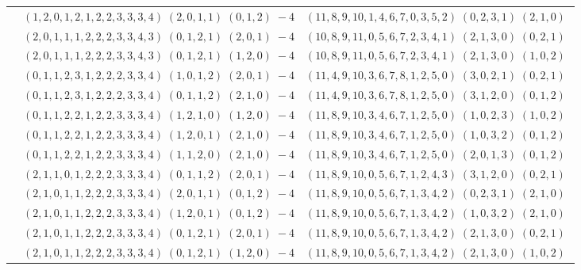 \documentclass[11pt]{article}
\begin{document}
\begin{longtable}[l]{|c|c|c|}
 \cline{2-3} 
 & $(1 ,2 ,0 ,1 ,2 ,1 ,2 ,2 ,3 ,3 ,3 ,4) \;(2 ,0 ,1 ,1) \;(0 ,1 ,2) \;-4$ & $(11 ,8 ,9 ,10 ,1 ,4 ,6 ,7 ,0 ,3 ,5 ,2) \;(0 ,2 ,3 ,1) \;(2 ,1 ,0) \;$\\ 
 \cline{2-3} 
 & $(2 ,0 ,1 ,1 ,1 ,2 ,2 ,2 ,3 ,3 ,4 ,3) \;(0 ,1 ,2 ,1) \;(2 ,0 ,1) \;-4$ & $(10 ,8 ,9 ,11 ,0 ,5 ,6 ,7 ,2 ,3 ,4 ,1) \;(2 ,1 ,3 ,0) \;(0 ,2 ,1) \;$\\ 
 \cline{2-3} 
 & $(2 ,0 ,1 ,1 ,1 ,2 ,2 ,2 ,3 ,3 ,4 ,3) \;(0 ,1 ,2 ,1) \;(1 ,2 ,0) \;-4$ & $(10 ,8 ,9 ,11 ,0 ,5 ,6 ,7 ,2 ,3 ,4 ,1) \;(2 ,1 ,3 ,0) \;(1 ,0 ,2) \;$\\ 
 \cline{2-3} 
 & $(0 ,1 ,1 ,2 ,3 ,1 ,2 ,2 ,2 ,3 ,3 ,4) \;(1 ,0 ,1 ,2) \;(2 ,0 ,1) \;-4$ & $(11 ,4 ,9 ,10 ,3 ,6 ,7 ,8 ,1 ,2 ,5 ,0) \;(3 ,0 ,2 ,1) \;(0 ,2 ,1) \;$\\ 
 \cline{2-3} 
 & $(0 ,1 ,1 ,2 ,3 ,1 ,2 ,2 ,2 ,3 ,3 ,4) \;(0 ,1 ,1 ,2) \;(2 ,1 ,0) \;-4$ & $(11 ,4 ,9 ,10 ,3 ,6 ,7 ,8 ,1 ,2 ,5 ,0) \;(3 ,1 ,2 ,0) \;(0 ,1 ,2) \;$\\ 
 \cline{2-3} 
 & $(0 ,1 ,1 ,2 ,2 ,1 ,2 ,2 ,3 ,3 ,3 ,4) \;(1 ,2 ,1 ,0) \;(1 ,2 ,0) \;-4$ & $(11 ,8 ,9 ,10 ,3 ,4 ,6 ,7 ,1 ,2 ,5 ,0) \;(1 ,0 ,2 ,3) \;(1 ,0 ,2) \;$\\ 
 \cline{2-3} 
 & $(0 ,1 ,1 ,2 ,2 ,1 ,2 ,2 ,3 ,3 ,3 ,4) \;(1 ,2 ,0 ,1) \;(2 ,1 ,0) \;-4$ & $(11 ,8 ,9 ,10 ,3 ,4 ,6 ,7 ,1 ,2 ,5 ,0) \;(1 ,0 ,3 ,2) \;(0 ,1 ,2) \;$\\ 
 \cline{2-3} 
 & $(0 ,1 ,1 ,2 ,2 ,1 ,2 ,2 ,3 ,3 ,3 ,4) \;(1 ,1 ,2 ,0) \;(2 ,1 ,0) \;-4$ & $(11 ,8 ,9 ,10 ,3 ,4 ,6 ,7 ,1 ,2 ,5 ,0) \;(2 ,0 ,1 ,3) \;(0 ,1 ,2) \;$\\ 
 \cline{2-3} 
 & $(2 ,1 ,1 ,0 ,1 ,2 ,2 ,2 ,3 ,3 ,3 ,4) \;(0 ,1 ,1 ,2) \;(2 ,0 ,1) \;-4$ & $(11 ,8 ,9 ,10 ,0 ,5 ,6 ,7 ,1 ,2 ,4 ,3) \;(3 ,1 ,2 ,0) \;(0 ,2 ,1) \;$\\ 
 \cline{2-3} 
 & $(2 ,1 ,0 ,1 ,1 ,2 ,2 ,2 ,3 ,3 ,3 ,4) \;(2 ,0 ,1 ,1) \;(0 ,1 ,2) \;-4$ & $(11 ,8 ,9 ,10 ,0 ,5 ,6 ,7 ,1 ,3 ,4 ,2) \;(0 ,2 ,3 ,1) \;(2 ,1 ,0) \;$\\ 
 \cline{2-3} 
 & $(2 ,1 ,0 ,1 ,1 ,2 ,2 ,2 ,3 ,3 ,3 ,4) \;(1 ,2 ,0 ,1) \;(0 ,1 ,2) \;-4$ & $(11 ,8 ,9 ,10 ,0 ,5 ,6 ,7 ,1 ,3 ,4 ,2) \;(1 ,0 ,3 ,2) \;(2 ,1 ,0) \;$\\ 
 \cline{2-3} 
 & $(2 ,1 ,0 ,1 ,1 ,2 ,2 ,2 ,3 ,3 ,3 ,4) \;(0 ,1 ,2 ,1) \;(2 ,0 ,1) \;-4$ & $(11 ,8 ,9 ,10 ,0 ,5 ,6 ,7 ,1 ,3 ,4 ,2) \;(2 ,1 ,3 ,0) \;(0 ,2 ,1) \;$\\ 
 \cline{2-3} 
 & $(2 ,1 ,0 ,1 ,1 ,2 ,2 ,2 ,3 ,3 ,3 ,4) \;(0 ,1 ,2 ,1) \;(1 ,2 ,0) \;-4$ & $(11 ,8 ,9 ,10 ,0 ,5 ,6 ,7 ,1 ,3 ,4 ,2) \;(2 ,1 ,3 ,0) \;(1 ,0 ,2) \;$\\ 

\end{longtable}
\end{document}
